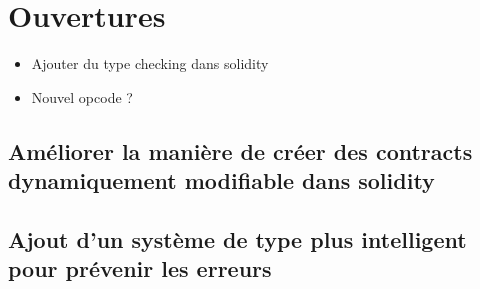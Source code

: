 \section{Ouvertures}

\begin{itemize}
    \item Ajouter du type checking dans solidity
    \item Nouvel opcode ?
\end{itemize}

\subsection{Améliorer la manière de créer des contracts dynamiquement modifiable dans solidity}


\subsection{Ajout d'un système de type plus intelligent pour prévenir les erreurs}
